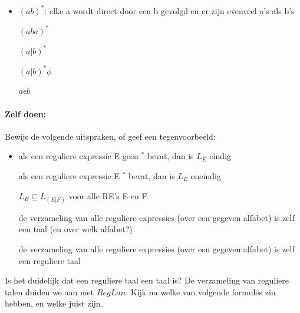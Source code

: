 \begin{itemize}
\item[]
$(ab)^*$: elke a wordt direct door een b gevolgd en er zijn evenveel a's als
b's

$(aba)^*$

$(a|b)^*$

$(a|b)^*\phi$

$a \epsilon b$
\end{itemize}


\paragraph{Zelf doen:}
Bewijs de volgende uitspraken, of geef een tegenvoorbeeld:

\begin{itemize}
\item[]
als een reguliere expressie E geen $^*$ bevat, dan is $L_E$ eindig

als een reguliere expressie E $^*$ bevat, dan is $L_E$ oneindig

$L_E \subseteq L_{(E|F)}$ voor alle RE's E en F

de verzameling van alle reguliere expressies (over een gegeven
alfabet) is zelf een taal (en over welk alfabet?)

de verzameling van alle reguliere expressies (over een gegeven
alfabet) is zelf een reguliere taal
\end{itemize}


\medskip





Is het duidelijk dat een reguliere taal een taal is? De verzameling van
reguliere talen duiden we aan met $RegLan$. Kijk na welke van volgende
formules zin hebben, en welke juist zijn.

